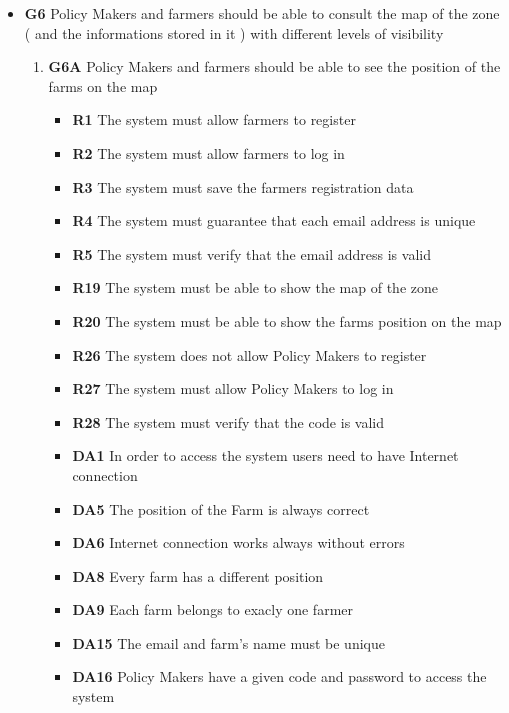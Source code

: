 \begin{itemize}
    \item \textbf{G6} Policy Makers and farmers should be able to consult the map of the zone ( and the informations stored in it ) with different levels of visibility
        \begin{enumerate}
            \item \textbf{G6A} Policy Makers and farmers should be able to see the position of the farms on the map
            \begin{itemize}
                \renewcommand\labelitemi{--}
                \item\textbf{R1} The system must allow farmers to register
                \item\textbf{R2} The system must allow farmers to log in
                \item\textbf{R3} The system must save the farmers registration data
                \item\textbf{R4} The system must guarantee that each email address is unique
                \item\textbf{R5} The system must verify that the email address is valid
                \item\textbf{R19} The system must be able to show the map of the zone
                \item\textbf{R20} The system must be able to show the farms position on the map
                \item\textbf{R26} The system does not allow Policy Makers to register
                \item\textbf{R27} The system must allow Policy Makers to log in
                \item\textbf{R28} The system must verify that the code is valid
                \item\textbf{DA1} In order to access the system users need to have Internet connection
                \item\textbf{DA5} The position of the Farm is always correct
                \item\textbf{DA6} Internet connection works always without errors
                \item \textbf{DA8} Every farm has a different position
                \item \textbf{DA9} Each farm belongs to exacly one farmer
                \item \textbf{DA15} The email and farm's name must be unique
                \item \textbf{DA16} Policy Makers have a given code and password to access the system

\end{itemize}
\end{enumerate}
\end{itemize}
